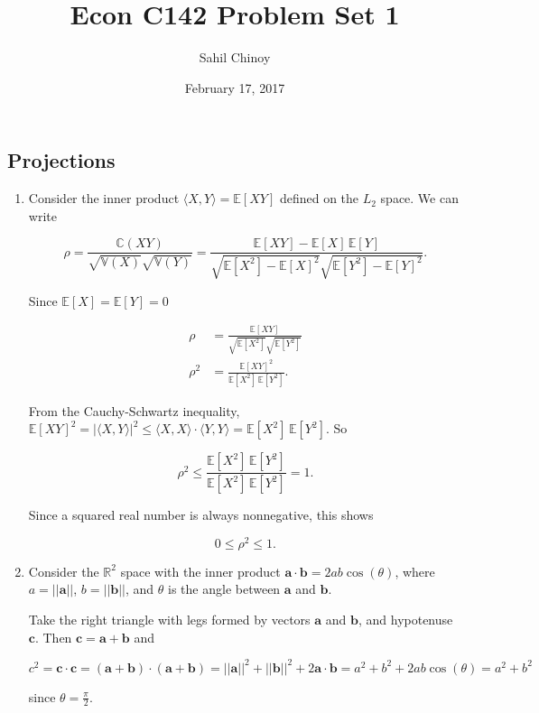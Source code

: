 \documentclass{article}
\title{Econ C142 Problem Set 1}
\author{Sahil Chinoy}
\date{February 17, 2017}
\begin{document}
\maketitle{}

\subsection*{Projections}

\begin{enumerate}

	\item Consider the inner product $\langle X,Y \rangle = \mathbb{E}[XY]$ defined on the $L_2$ space. We can write

	\begin{equation*}
	\rho = \frac{\mathbb{C}(XY)} {\sqrt{\mathbb{V}(X)} \sqrt{\mathbb{V}(Y)}} = \frac{\mathbb{E}[XY] - \mathbb{E}[X] \, \mathbb{E}[Y] } {\sqrt{\mathbb{E}[X^2] - \mathbb{E}[X]^2} \sqrt{\mathbb{E}[Y^2] - \mathbb{E}[Y]^2}}.
	\end{equation*}

	Since $\mathbb{E}[X] = \mathbb{E}[Y] = 0$

	\begin{align*}
	\rho &= \frac{\mathbb{E}[XY]} {\sqrt{\mathbb{E}[X^2]} \sqrt{\mathbb{E}[Y^2]}} \\
	\rho^2 &= \frac{\mathbb{E}[XY]^2} {\mathbb{E}[X^2] \, \mathbb{E}[Y^2]}.
	\end{align*}

	From the Cauchy-Schwartz inequality, $\mathbb{E}[XY]^2 = | \langle X,Y \rangle |^2 \leq \langle X,X \rangle \cdot \langle Y,Y \rangle = \mathbb{E}[X^2] \, \mathbb{E}[Y^2]$. So

	\begin{equation*}
	\rho^2 \leq \frac{\mathbb{E}[X^2] \, \mathbb{E}[Y^2]} {\mathbb{E}[X^2] \, \mathbb{E}[Y^2]} = 1.
	\end{equation*}

	Since a squared real number is always nonnegative, this shows

	\begin{equation*}
	0 \leq \rho^2 \leq 1.
	\end{equation*}

	\item

	Consider the $\mathbb{R}^2$ space with the inner product $\mathbf{a} \cdot \mathbf{b} = 2ab \cos(\theta)$, where $a = ||\mathbf{a}||$, $b = ||\mathbf{b}||$, and $\theta$ is the angle between $\mathbf{a}$ and $\mathbf{b}$.

	Take the right triangle with legs formed by vectors $\mathbf{a}$ and $\mathbf{b}$, and hypotenuse $\mathbf{c}$. Then $\mathbf{c} = \mathbf{a} + \mathbf{b}$ and

	\begin{equation*}
	c^2 = \mathbf{c} \cdot \mathbf{c} = (\mathbf{a} + \mathbf{b}) \cdot (\mathbf{a} + \mathbf{b}) = || \mathbf{a} || ^2 + || \mathbf{b} || ^2 + 2 \mathbf{a} \cdot \mathbf{b} = a^2 + b^2 + 2ab \cos(\theta) = a^2 + b^2
	\end{equation*}

	since $\theta = \frac{\pi}{2}$.

\end{enumerate}
\end{document}
